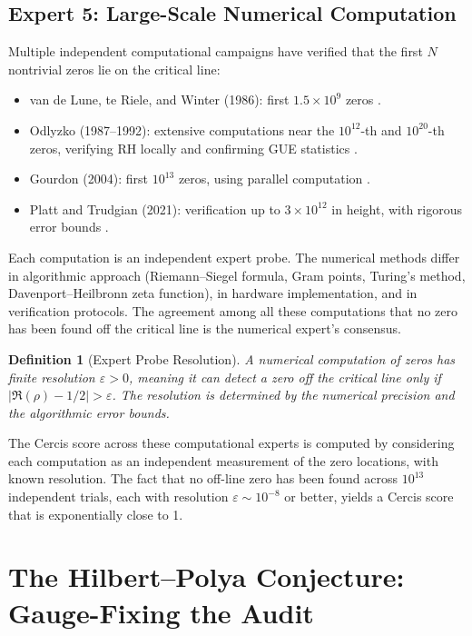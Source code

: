 \documentclass[12pt,a4paper]{article}
\newtheorem{definition}[theorem]{Definition}
\theoremstyle{remark}
\begin{document}
\subsection{Expert 5: Large-Scale Numerical Computation}
\label{sec:expert5}
Multiple independent computational campaigns have verified that the first
$N$ nontrivial zeros lie on the critical line:
\begin{itemize}
  \item van de Lune, te Riele, and Winter (1986): first $1.5 \times 10^9$
        zeros \cite{vandeLune1986}.
  \item Odlyzko (1987--1992): extensive computations near the $10^{12}$-th
        and $10^{20}$-th zeros, verifying RH locally and confirming GUE
        statistics \cite{Odlyzko1987, Odlyzko1992}.
  \item Gourdon (2004): first $10^{13}$ zeros, using parallel computation
        \cite{Gourdon2004}.
  \item Platt and Trudgian (2021): verification up to $3 \times 10^{12}$
        in height, with rigorous error bounds \cite{PlattTrudgian2021}.
\end{itemize}
Each computation is an independent expert probe. The numerical methods
differ in algorithmic approach (Riemann--Siegel formula, Gram points,
Turing's method, Davenport--Heilbronn zeta function), in hardware
implementation, and in verification protocols. The agreement among all
these computations that no zero has been found off the critical line is
the numerical expert's consensus.
\begin{definition}[Expert Probe Resolution]
\label{def:probe_resolution}
A numerical computation of zeros has finite resolution $\varepsilon > 0$,
meaning it can detect a zero off the critical line only if
$|\Re(\rho) - 1/2| > \varepsilon$. The resolution is determined by the
numerical precision and the algorithmic error bounds.
\end{definition}
The Cercis score across these computational experts is computed by
considering each computation as an independent measurement of the zero
locations, with known resolution. The fact that no off-line zero has been
found across $10^{13}$ independent trials, each with resolution
$\varepsilon \sim 10^{-8}$ or better, yields a Cercis score that is
exponentially close to 1.
\section{The Hilbert--Polya Conjecture: Gauge-Fixing the Audit}
\label{sec:hp_gauge}
\end{document}
